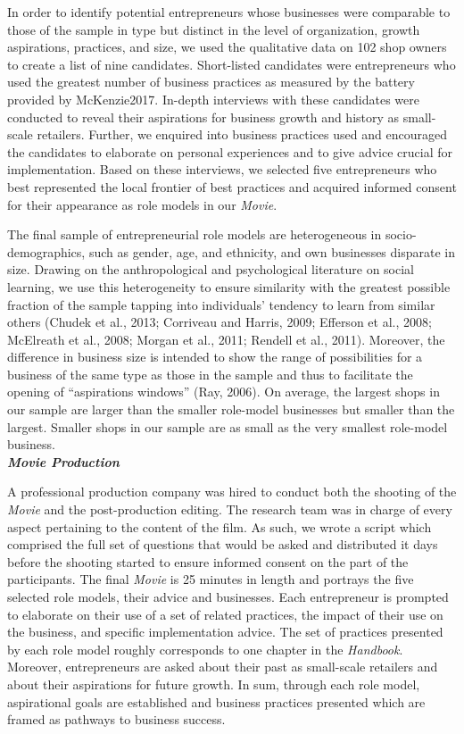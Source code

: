 \documentclass[11.5pt]{article}
\begin{document}
{\noindent In order to identify potential entrepreneurs whose businesses were comparable to those of the sample in type but distinct in the level of organization, growth aspirations, practices, and size, we used the qualitative data on 102 shop owners to create a list of nine candidates. Short-listed candidates were entrepreneurs who used the greatest number of business practices as measured by the battery provided by McKenzie2017. In-depth interviews with these candidates were conducted to reveal their aspirations for business growth and history as small-scale retailers. Further, we enquired into business practices used and encouraged the candidates to elaborate on personal experiences and to give advice crucial for implementation. Based on these interviews, we selected five entrepreneurs who best represented the local frontier of best practices and acquired informed consent for their appearance as role models in our \emph{Movie}.

The final sample of entrepreneurial role models are heterogeneous in socio-demographics, such as gender, age, and ethnicity, and own businesses disparate in size. Drawing on the anthropological and psychological literature on social learning, we use this heterogeneity to ensure similarity with the greatest possible fraction of the sample tapping into individuals' tendency to learn from similar others (Chudek et al., 2013; Corriveau and Harris, 2009; Efferson et al., 2008; McElreath et al., 2008; Morgan et al., 2011; Rendell et al., 2011). Moreover, the difference in business size is intended to show the range of possibilities for a business of the same type as those in the sample and thus to facilitate the opening of ``aspirations windows'' (Ray, 2006). On average, the largest shops in our sample are larger than the smaller role-model businesses but smaller than the largest. Smaller shops in our sample are as small as the very smallest role-model business.\\

\noindent \emph{\textbf{Movie Production}}\

\noindent A professional production company was hired to conduct both the shooting of the \emph{Movie} and the post-production editing. The research team was in charge of every aspect pertaining to the content of the film. As such, we wrote a script which comprised the full set of questions that would be asked and distributed it days before the shooting started to ensure informed consent on the part of the participants. The final \emph{Movie} is 25 minutes in length and portrays the five selected role models, their advice and businesses. Each entrepreneur is prompted to elaborate on their use of a set of related practices, the impact of their use on the business, and specific implementation advice. The set of practices presented by each role model roughly corresponds to one chapter in the \emph{Handbook}. Moreover, entrepreneurs are asked about their past as small-scale retailers and about their aspirations for future growth. In sum, through each role model, aspirational goals are established and business practices presented which are framed as pathways to business success. \\

}
\end{document}
